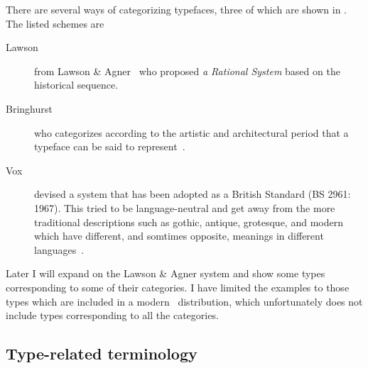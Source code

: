 \documentclass[10pt,a4paper,oneside,extrafontsizes]{memoir}%
\begin{document}
\begin{paracol}{2}
\switchEng
    There are several ways of categorizing typefaces, three of which are
shown in . The listed schemes are
\begin{description}
\item[Lawson] from 
Lawson \& Agner~\autocite{LAWSONAGNER90} who proposed  
\emph{a Rational System} based on the historical sequence.
\item[Bringhurst] who categorizes according to the artistic and architectural
period that a typeface can be said to represent~\autocite{BRINGHURST99}.
\item[Vox] devised a system that has been adopted as a British Standard 
(BS 2961: 1967). This tried to be language-neutral and get away from
the more traditional descriptions such as gothic, antique, grotesque, and 
modern which have different, and somtimes opposite, meanings in different
languages~\autocite{MCLEAN80}.
\end{description}
Later I will expand on the Lawson \& Agner system and show some types 
corresponding to some of their categories. I have limited the examples to 
those types which are included in a modern \ltx\ 
distribution, 
which unfortunately does not include types corresponding to all the 
categories.
\end{paracol}


\subsection{Type-related terminology}
\end{document}
